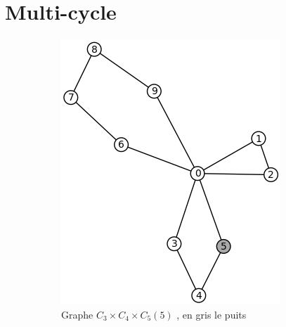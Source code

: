 \documentclass{report}
\begin{document}
\chapter{Multi-cycle}
\begin{figure}[h]
\begin{center}
\begin{subfigure}[b]{0.1\textwidth}
   \includegraphics[width=3\linewidth, scale=2]{mcycle1.png}
   \caption{Graphe $C_3 \times C_4 \times C_5(5)$ , en gris le puits}
\end{subfigure} \hspace{6cm}%
\begin{subfigure}[b]{0.1\textwidth}

\end{subfigure}
\end{center}
\end{figure}
\end{document}
